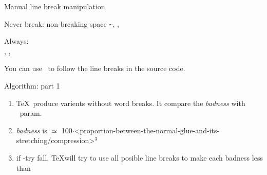 \begin{frame}{Manual line break manipulation\magicPage}\relax

    Never break: non-breaking space \verb|~|, \ccol\nobreak, \ccol\nolinebreak
    
    Always: \ccol\\, \ccol\break, \ccol\linebreak
    
    You can use \ccol\obeylines\ to follow the line breaks in the source code.
     
\end{frame}

\begin{frame}{Algorithm: part 1\magicPage}\relax
    
    \begin{enumerate}
        \item \TeX\ produce varients without word breaks. It compare the \textit{badness} with \ccol\pretolerance\ param. 
        \item \textit{badness} is $\simeq$ 100$\cdot$<proportion-between-the-normal-glue-and-its-stretching/compression>$^3$
        \item if \ccol\pretolerance-try fall, \TeX will try to use all posible line breaks to make each badness less than \ccol\tolerance
         
    \end{enumerate}
     
\end{frame}

